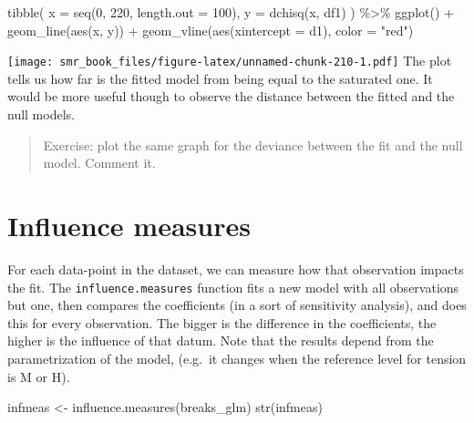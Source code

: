 \documentclass[
  oneside]{book}
\newenvironment{Shaded}{\begin{snugshade}}{\end{snugshade}}
\newcommand{\AttributeTok}[1]{\textcolor[rgb]{0.77,0.63,0.00}{#1}}
\newcommand{\DecValTok}[1]{\textcolor[rgb]{0.00,0.00,0.81}{#1}}
\newcommand{\FunctionTok}[1]{\textcolor[rgb]{0.00,0.00,0.00}{#1}}
\newcommand{\NormalTok}[1]{#1}
\newcommand{\OtherTok}[1]{\textcolor[rgb]{0.56,0.35,0.01}{#1}}
\newcommand{\SpecialCharTok}[1]{\textcolor[rgb]{0.00,0.00,0.00}{#1}}
\newcommand{\StringTok}[1]{\textcolor[rgb]{0.31,0.60,0.02}{#1}}
\begin{document}
\begin{Shaded}
\begin{Highlighting}[]
\FunctionTok{tibble}\NormalTok{(}
  \AttributeTok{x =} \FunctionTok{seq}\NormalTok{(}\DecValTok{0}\NormalTok{, }\DecValTok{220}\NormalTok{, }\AttributeTok{length.out =} \DecValTok{100}\NormalTok{),}
  \AttributeTok{y =} \FunctionTok{dchisq}\NormalTok{(x, df1)}
\NormalTok{) }\SpecialCharTok{\%\textgreater{}\%}
  \FunctionTok{ggplot}\NormalTok{() }\SpecialCharTok{+}
  \FunctionTok{geom\_line}\NormalTok{(}\FunctionTok{aes}\NormalTok{(x, y)) }\SpecialCharTok{+}
  \FunctionTok{geom\_vline}\NormalTok{(}\FunctionTok{aes}\NormalTok{(}\AttributeTok{xintercept =}\NormalTok{ d1), }\AttributeTok{color =} \StringTok{"red"}\NormalTok{)}
\end{Highlighting}
\end{Shaded}

\texttt{[image: smr\_book\_files/figure-latex/unnamed-chunk-210-1.pdf]}
The plot tells us how far is the fitted model from being equal
to the saturated one. It would be more useful though to
observe the distance between the fitted and the null models.

\begin{quote}
Exercise: plot the same graph for the deviance between the fit
and the null model. Comment it.
\end{quote}

\hypertarget{influence-measures}{%
\section{Influence measures}\label{influence-measures}}

For each data-point in the dataset, we can measure how that
observation impacts the fit. The \texttt{influence.measures} function
fits a new model with all observations but one, then compares the
coefficients (in a sort of sensitivity analysis), and does this for
every observation. The bigger is the difference in the coefficients,
the higher is the influence of that datum.
Note that the results depend from the parametrization of the model,
(e.g.~it changes when the reference level for tension is M or H).

\begin{Shaded}
\begin{Highlighting}[]
\NormalTok{infmeas }\OtherTok{\textless{}{-}} \FunctionTok{influence.measures}\NormalTok{(breaks\_glm)}
\FunctionTok{str}\NormalTok{(infmeas)}
\end{Highlighting}
\end{Shaded}
\end{document}
